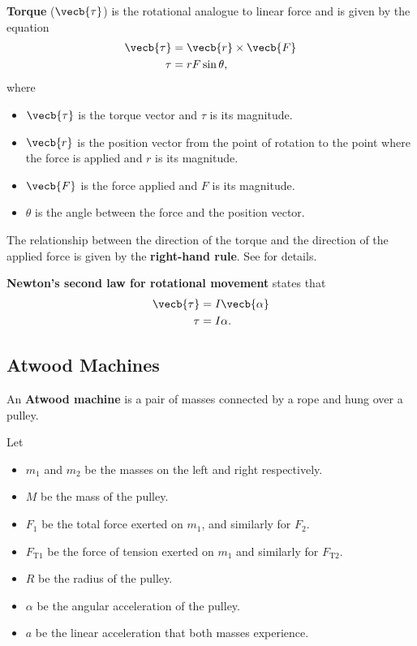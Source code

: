 \textbf{Torque} (\(\vecb{\tau}\)) is the rotational analogue to linear force
and is given by the equation
\begin{equation}
    \begin{aligned}
        \vecb{\tau} &= \vecb{r} \times \vecb{F} \\
        \tau &= r F \sin\theta,
    \end{aligned}
\end{equation}
where
\begin{itemize}
    \item \(\vecb{\tau}\) is the torque vector and \(\tau\) is its magnitude.
    \item \(\vecb{r}\) is the position vector from the point of rotation
        to the point where the force is applied
        and \(r\) is its magnitude.
    \item \(\vecb{F}\) is the force applied and \(F\) is its magnitude.
    \item \(\theta\) is the angle between the force and the position vector.
\end{itemize}

The relationship between the direction of the torque
and the direction of the applied force is given by the \textbf{right-hand rule}.
See  for details.

\textbf{Newton's second law for rotational movement} states that
\begin{equation} \label{eq:newtons-2nd-law-rotational}
    \begin{aligned}
        \vecb{\tau} &= I \vecb{\alpha} \\
        \tau &= I \alpha.
    \end{aligned}
\end{equation}

\subsection{Atwood Machines}

An \textbf{Atwood machine} is a pair of masses connected by a rope
and hung over a pulley.

Let
\begin{itemize}
    \item \(m_1\) and \(m_2\) be
        the masses on the left and right respectively.
    \item \(M\) be the mass of the pulley.
    \item \(F_1\) be the total force exerted on \(m_1\),
        and similarly for \(F_2\).
    \item \(F_\mathrm{T1}\) be the force of tension exerted on \(m_1\)
        and similarly for \(F_\mathrm{T2}\).
    \item \(R\) be the radius of the pulley.
    \item \(\alpha\) be the angular acceleration of the pulley.
    \item \(a\) be the linear acceleration that both masses experience.
\end{itemize}

